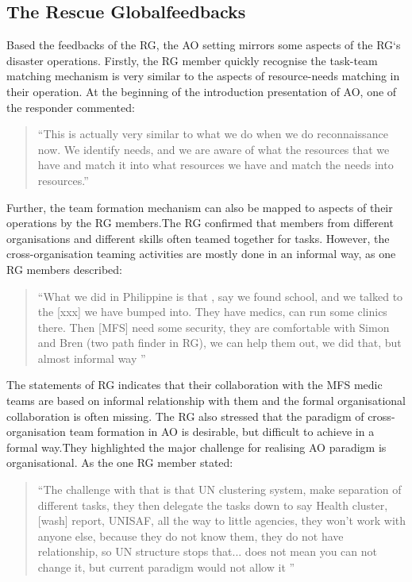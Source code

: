 \subsection{The Rescue Globalfeedbacks}
Based the feedbacks of the RG, the AO setting  mirrors some aspects of the RG`s disaster operations. Firstly, the RG member quickly recognise the task-team matching mechanism is very similar to the aspects of resource-needs matching in their operation. At the beginning of the introduction presentation of AO, one of the responder commented: \\

\begin{quotation}
``This is actually very similar to what we do when we do reconnaissance now. We identify needs, and we are aware of what the resources that we have and match it into what resources we have and match the needs into resources.''\\
\end{quotation}

Further, the team formation mechanism can also be mapped to aspects of their operations by the RG members.The RG confirmed that members from different organisations and different skills often teamed together for tasks. However, the cross-organisation teaming activities are mostly done in an informal way, as one RG members described: \\

\begin{quotation}
``What we did in Philippine is that , say we found school, and we talked to the [xxx] we have bumped into. They have medics, can run some clinics there. Then [MFS] need some security, they are comfortable with Simon and Bren (two path finder in RG), we can help them out, we did that, but almost informal way '' \\
\end{quotation}

The statements of RG indicates that their collaboration with the MFS medic teams are based on informal  relationship with them and the formal organisational collaboration is often missing. The RG also stressed that the paradigm of cross-organisation team formation in AO is desirable, but difficult to achieve in a formal way.They highlighted the major challenge for realising AO paradigm is organisational. As the one RG member stated:\\

\begin{quotation}
``The challenge with that is that UN clustering system, make separation of different tasks, they then delegate the tasks down to say Health cluster, [wash] report, UNISAF, all the way to little agencies, they won't work with anyone else, because they do not know them, they do not have relationship, so UN structure stops that... does not mean you can not change it, but current paradigm would not allow it ''
\end{quotation}

